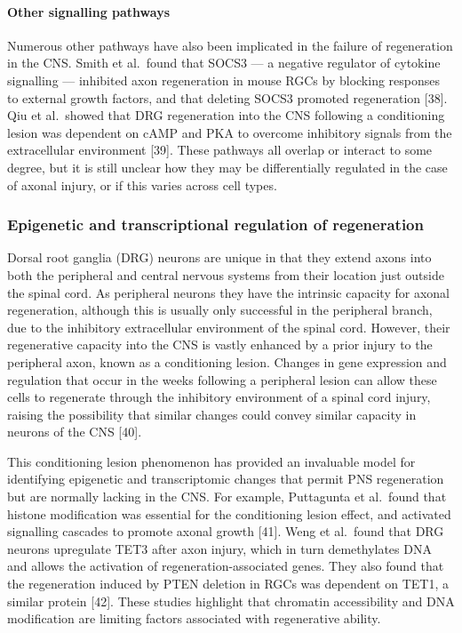 \documentclass[
  12pt,
  a4paper,
]{book}
\begin{document}
\paragraph{Other signalling pathways}\label{other-signalling-pathways}

Numerous other pathways have also been implicated in the failure of regeneration in the CNS. Smith et al.~found that SOCS3 --- a negative regulator of cytokine signalling --- inhibited axon regeneration in mouse RGCs by blocking responses to external growth factors, and that deleting SOCS3 promoted regeneration {[}38{]}. Qiu et al.~showed that DRG regeneration into the CNS following a conditioning lesion was dependent on cAMP and PKA to overcome inhibitory signals from the extracellular environment {[}39{]}. These pathways all overlap or interact to some degree, but it is still unclear how they may be differentially regulated in the case of axonal injury, or if this varies across cell types.

\subsubsection{Epigenetic and transcriptional regulation of regeneration}\label{epigenetic-and-transcriptional-regulation-of-regeneration}

Dorsal root ganglia (DRG) neurons are unique in that they extend axons into both the peripheral and central nervous systems from their location just outside the spinal cord. As peripheral neurons they have the intrinsic capacity for axonal regeneration, although this is usually only successful in the peripheral branch, due to the inhibitory extracellular environment of the spinal cord. However, their regenerative capacity into the CNS is vastly enhanced by a prior injury to the peripheral axon, known as a conditioning lesion. Changes in gene expression and regulation that occur in the weeks following a peripheral lesion can allow these cells to regenerate through the inhibitory environment of a spinal cord injury, raising the possibility that similar changes could convey similar capacity in neurons of the CNS {[}40{]}.

This conditioning lesion phenomenon has provided an invaluable model for identifying epigenetic and transcriptomic changes that permit PNS regeneration but are normally lacking in the CNS. For example, Puttagunta et al.~found that histone modification was essential for the conditioning lesion effect, and activated signalling cascades to promote axonal growth {[}41{]}. Weng et al.~found that DRG neurons upregulate TET3 after axon injury, which in turn demethylates DNA and allows the activation of regeneration-associated genes. They also found that the regeneration induced by PTEN deletion in RGCs was dependent on TET1, a similar protein {[}42{]}. These studies highlight that chromatin accessibility and DNA modification are limiting factors associated with regenerative ability.
\end{document}
